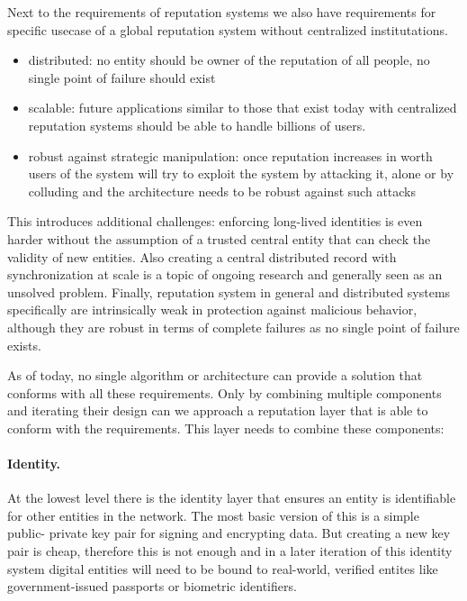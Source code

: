 Next to the requirements of reputation systems we also have requirements for specific usecase of a
global reputation system without centralized institutations.


\begin{itemize}
    \item distributed: no entity should be owner of the reputation of all people, no single point of
    failure should exist
    \item scalable: future applications similar to those that exist today with centralized reputation
    systems should be able to handle billions of users.
    \item robust against strategic manipulation: once reputation increases in worth users of the 
    system will try to exploit the system by attacking it, alone or by colluding and the
    architecture needs to be robust against such attacks
\end{itemize}
  
This introduces additional challenges: enforcing long-lived identities is even harder without the 
assumption of a trusted central entity that can check the validity of new entities. Also creating
a central distributed record with synchronization at scale is a topic of ongoing research and 
generally seen as an unsolved problem. Finally, reputation system in general and distributed systems
specifically are intrinsically weak in protection against malicious behavior, although they are 
robust in terms of complete failures as no single point of failure exists.

As of today, no single algorithm or architecture can provide a solution that conforms with all these 
requirements. Only by combining multiple components and iterating their design can we approach a 
reputation layer that is able to conform with the requirements. This layer needs to combine these
components:

\paragraph{Identity.} At the lowest level there is the identity layer that ensures an entity is 
identifiable for other entities in the network. The most basic version of this is a simple public-
private key pair for signing and encrypting data. But creating a new key pair is cheap, therefore 
this is not enough and in a later iteration of this identity system digital entities will need to be 
bound to real-world, verified entites like government-issued passports or biometric identifiers.

